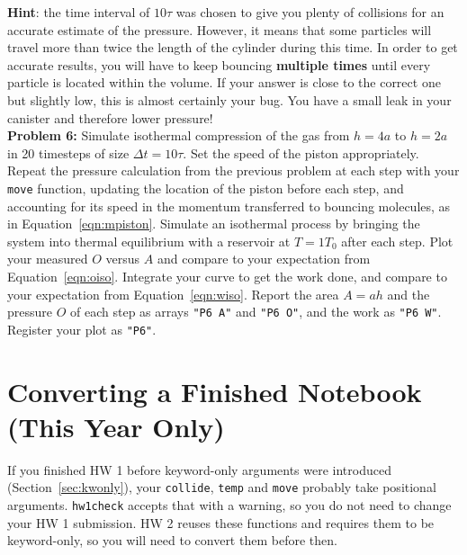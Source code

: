 \documentclass[12pt]{article}
\begin{document}
\noindent
{\bf Hint}: the time interval of $10\tau$ was chosen to give you
plenty of collisions for an accurate estimate of the pressure.
However, it means that some particles will travel more than twice the
length of the cylinder during this time.  In order to get accurate
results, you will have to keep bouncing {\bf multiple times} until
every particle is located within the volume.  If your answer is close
to the correct one but slightly low, this is almost certainly your
bug.  You have a small leak in your canister and therefore lower
pressure!\\[3pt]

\noindent
{\bf Problem 6:}
Simulate isothermal compression of the gas from $h=4a$ to $h=2a$ in 20
timesteps of size $\Delta t = 10 \tau$.  Set the speed of the piston
appropriately.  Repeat the pressure calculation from the previous
problem at each step with your {\tt move} function, updating the location
of the piston before each step, and accounting for its speed in the
momentum transferred to bouncing molecules, as in
Equation~\ref{eqn:mpiston}.  Simulate an isothermal process by bringing
the system into thermal equilibrium with a reservoir at $T = 1 T_0$
after each step.  Plot your measured $O$ versus $A$ and compare to your
expectation from Equation~\ref{eqn:oiso}.  Integrate your curve to get
the work done, and compare to your expectation from
Equation~\ref{eqn:wiso}.  Report the area $A = a h$ and the pressure
$O$ of each step as arrays {\tt "P6 A"} and {\tt "P6 O"}, and the work
as {\tt "P6 W"}.  Register your plot as {\tt "P6"}.\\[3pt]

\appendix
\section{Converting a Finished Notebook (This Year Only)}

\noindent
If you finished HW 1 before keyword-only arguments were introduced (Section~\ref{sec:kwonly}), your
{\tt collide}, {\tt temp} and {\tt move} probably take positional arguments.  {\tt hw1check} accepts
that with a warning, so you do not need to change your HW 1 submission.  HW 2 reuses these functions
and requires them to be keyword-only, so you will need to convert them before then.
\end{document}
